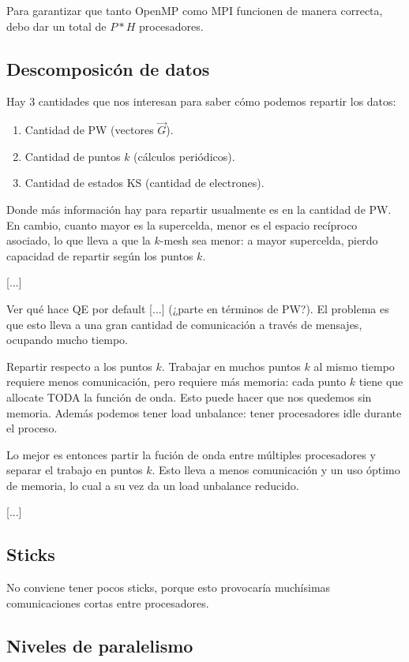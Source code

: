   Para garantizar que tanto OpenMP como MPI funcionen de manera correcta, debo dar un total de $P*H$ procesadores.


\subsection{Descomposicón de datos}

  Hay 3 cantidades que nos interesan para saber cómo podemos repartir los datos:
    \begin{enumerate}
      \item Cantidad de PW (vectores $\vec{G}$).
      \item Cantidad de puntos $k$ (cálculos periódicos).
      \item Cantidad de estados KS (cantidad de electrones).
    \end{enumerate}

  Donde más información hay para repartir usualmente es en la cantidad de PW. En cambio, cuanto mayor es la supercelda, menor es el espacio recíproco asociado, lo que lleva a que la $k$-mesh sea menor: a mayor supercelda, pierdo capacidad de repartir según los puntos $k$.

  [...]

  Ver qué hace QE por default [...] (¿parte en términos de PW?). El problema es que esto lleva a una gran cantidad de comunicación a través de mensajes, ocupando mucho tiempo.

  Repartir respecto a los puntos $k$. Trabajar en muchos puntos $k$ al mismo tiempo requiere menos comunicación, pero requiere más memoria: cada punto $k$ tiene que allocate TODA la función de onda. Esto puede hacer que nos quedemos sin memoria. Además podemos tener load unbalance: tener procesadores idle durante el proceso.

  Lo mejor es entonces partir la fución de onda entre múltiples procesadores y separar el trabajo en puntos $k$. Esto lleva a menos comunicación y un uso óptimo de memoria, lo cual a su vez da un load unbalance reducido.

  [...]


\subsection{Sticks}

  No conviene tener pocos sticks, porque esto provocaría muchísimas comunicaciones cortas entre procesadores.


\subsection{Niveles de paralelismo}

